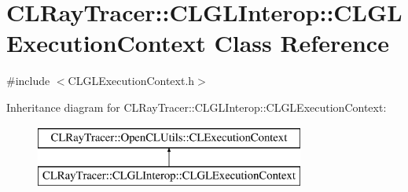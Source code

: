 \hypertarget{class_c_l_ray_tracer_1_1_c_l_g_l_interop_1_1_c_l_g_l_execution_context}{}\section{C\+L\+Ray\+Tracer\+:\+:C\+L\+G\+L\+Interop\+:\+:C\+L\+G\+L\+Execution\+Context Class Reference}
\label{class_c_l_ray_tracer_1_1_c_l_g_l_interop_1_1_c_l_g_l_execution_context}


{\ttfamily \#include $<$C\+L\+G\+L\+Execution\+Context.\+h$>$}

Inheritance diagram for C\+L\+Ray\+Tracer\+:\+:C\+L\+G\+L\+Interop\+:\+:C\+L\+G\+L\+Execution\+Context\+:\begin{figure}[H]
\begin{center}
\leavevmode
\includegraphics[height=2.000000cm]{class_c_l_ray_tracer_1_1_c_l_g_l_interop_1_1_c_l_g_l_execution_context}
\end{center}
\end{figure}
